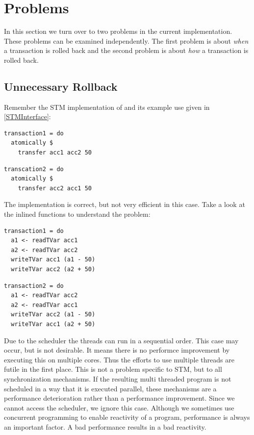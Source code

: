 \section{Problems}
In this section we turn over to two problems in the current implementation. These problems can be examined independently. The first problem is about
\textit{when} a transaction is rolled back and the second problem is about \textit{how} a transaction is rolled back.

\subsection{Unnecessary Rollback}
\label{Prob:UnRo}
Remember the STM implementation of  and its example use given in \ref{STMInterface}: 
\par\noindent
\begin{minipage}[t]{.45\textwidth}
\begin{lstlisting}[frame=lrtb]
transaction1 = do
  atomically $
    transfer acc1 acc2 50
\end{lstlisting}
\end{minipage}
\hfill
\begin{minipage}[t]{.45\textwidth}
\begin{lstlisting}[frame=lrtb]
transcation2 = do 
  atomically $ 
    transfer acc2 acc1 50
\end{lstlisting}
\end{minipage}

The implementation is correct, but not very efficient in this case. Take a look at the inlined functions to understand the 
problem:
\par\noindent
\begin{minipage}[t]{.45\textwidth}
\begin{lstlisting}[frame=lrtb]
transaction1 = do
  a1 <- readTVar acc1
  a2 <- readTVar acc2
  writeTVar acc1 (a1 - 50)
  writeTVar acc2 (a2 + 50)
\end{lstlisting}
\end{minipage}
\hfill
\begin{minipage}[t]{.45\textwidth}
\begin{lstlisting}[frame=lrtb]
transaction2 = do 
  a1 <- readTVar acc2
  a2 <- readTVar acc1
  writeTVar acc2 (a1 - 50)
  writeTVar acc1 (a2 + 50)
\end{lstlisting}
\end{minipage}

Due to the scheduler the threads can run in a sequential order. This case may occur, but is not desirable. It means 
there is no performce improvement by executing this on multiple cores. Thus the efforts to use multiple
threads are futile in the first place. This is not a problem specific to STM, but to all synchronization mechanisms. 
If the resulting multi threaded program is not scheduled in a way that it is executed parallel, these mechanisms are a
performance deterioration rather than a performance improvement. Since we cannot access the scheduler, we ignore 
this case. Although we sometimes use concurrent programming to enable reactivity of a program, performance is always
an important factor. A bad performance results in a bad reactivity.

